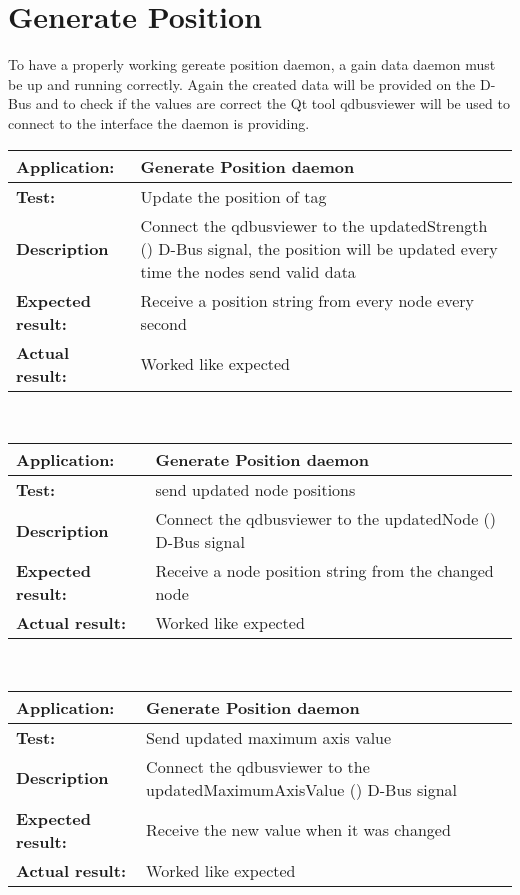  \section{Generate Position}
  To have a properly working gereate position daemon, a gain data daemon must be up and running correctly. Again the created data will be provided on the D-Bus and to check if the values are correct the Qt tool qdbusviewer will be used to connect to the interface the daemon is providing.\\
   \begin{tabular}{|p{3.5cm}|p{10.5cm}|}
    \hline
     \textbf{Application:}	& Generate Position daemon\\
    \hline
     \textbf{Test:}		& Update the position of tag\\
    \hline
     \textbf{Description}	& Connect the qdbusviewer to the updatedStrength () D-Bus signal, the position will be updated every time the nodes send valid data\\
    \hline
     \textbf{Expected result:}	& Receive a position string from every node every second\\
    \hline
     \textbf{Actual result:}	& Worked like expected\\
    \hline
   \end{tabular}\\
   \begin{tabular}{|p{3.5cm}|p{10.5cm}|}
    \hline
     \textbf{Application:}	& Generate Position daemon\\
    \hline
     \textbf{Test:}		& send updated node positions\\
    \hline
     \textbf{Description}	& Connect the qdbusviewer to the updatedNode () D-Bus signal\\
    \hline
     \textbf{Expected result:}	& Receive a node position string from the changed node\\
    \hline
     \textbf{Actual result:}	& Worked like expected\\
    \hline
   \end{tabular}\\
   \begin{tabular}{|p{3.5cm}|p{10.5cm}|}
    \hline
     \textbf{Application:}	& Generate Position daemon\\
    \hline
     \textbf{Test:}		& Send updated maximum axis value\\
    \hline
     \textbf{Description}	& Connect the qdbusviewer to the updatedMaximumAxisValue () D-Bus signal\\
    \hline
     \textbf{Expected result:}	& Receive the new value when it was changed\\
    \hline
     \textbf{Actual result:}	& Worked like expected\\
    \hline
   \end{tabular}\\

